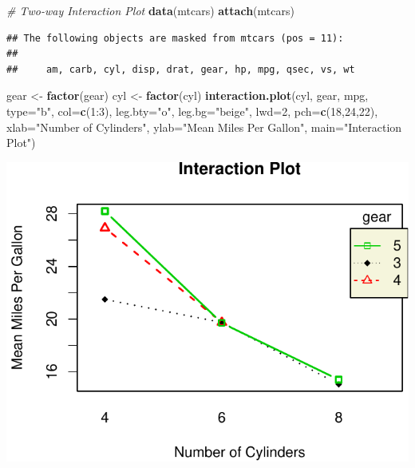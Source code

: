 \documentclass[]{article}
\newenvironment{Shaded}{\begin{snugshade}}{\end{snugshade}}
\newcommand{\KeywordTok}[1]{\textcolor[rgb]{0.13,0.29,0.53}{\textbf{{#1}}}}
\newcommand{\DataTypeTok}[1]{\textcolor[rgb]{0.13,0.29,0.53}{{#1}}}
\newcommand{\DecValTok}[1]{\textcolor[rgb]{0.00,0.00,0.81}{{#1}}}
\newcommand{\StringTok}[1]{\textcolor[rgb]{0.31,0.60,0.02}{{#1}}}
\newcommand{\CommentTok}[1]{\textcolor[rgb]{0.56,0.35,0.01}{\textit{{#1}}}}
\newcommand{\NormalTok}[1]{{#1}}
\numberwithin{equation}{section}
\begin{document}
\begin{Shaded}
\begin{Highlighting}[]
\CommentTok{# Two-way Interaction Plot}
\KeywordTok{data}\NormalTok{(mtcars)}
\KeywordTok{attach}\NormalTok{(mtcars)}
\end{Highlighting}
\end{Shaded}

\begin{verbatim}
## The following objects are masked from mtcars (pos = 11):
## 
##     am, carb, cyl, disp, drat, gear, hp, mpg, qsec, vs, wt
\end{verbatim}

\begin{Shaded}
\begin{Highlighting}[]
\NormalTok{gear <-}\StringTok{ }\KeywordTok{factor}\NormalTok{(gear)}
\NormalTok{cyl <-}\StringTok{ }\KeywordTok{factor}\NormalTok{(cyl)}
\KeywordTok{interaction.plot}\NormalTok{(cyl, gear, mpg, }\DataTypeTok{type=}\StringTok{"b"}\NormalTok{, }\DataTypeTok{col=}\KeywordTok{c}\NormalTok{(}\DecValTok{1}\NormalTok{:}\DecValTok{3}\NormalTok{),}
   \DataTypeTok{leg.bty=}\StringTok{"o"}\NormalTok{, }\DataTypeTok{leg.bg=}\StringTok{"beige"}\NormalTok{, }\DataTypeTok{lwd=}\DecValTok{2}\NormalTok{, }\DataTypeTok{pch=}\KeywordTok{c}\NormalTok{(}\DecValTok{18}\NormalTok{,}\DecValTok{24}\NormalTok{,}\DecValTok{22}\NormalTok{),}
   \DataTypeTok{xlab=}\StringTok{"Number of Cylinders"}\NormalTok{,}
   \DataTypeTok{ylab=}\StringTok{"Mean Miles Per Gallon"}\NormalTok{,}
   \DataTypeTok{main=}\StringTok{"Interaction Plot"}\NormalTok{)}
\end{Highlighting}
\end{Shaded}

\includegraphics{index_files/figure-latex/unnamed-chunk-223-1.pdf}
\end{document}
